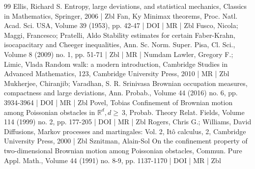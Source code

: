 \documentclass[10pt]{amsart}
\theoremstyle{definition}\newtheorem{defi}[theo]{Definition}\newtheorem{rema}[theo]{Remark}\newtheorem{exam}[theo]{Example}\newtheorem{exem}[theo]{Example}\newtheorem{nota}[theo]{Notation}
\begin{document}
\begin{thebibliography}{99}
Ellis, Richard S. Entropy, large deviations, and statistical mechanics, Classics in Mathematics, Springer, 2006 | Zbl
Fan, Ky Minimax theorems, Proc. Natl. Acad. Sci. USA, Volume 39 (1953), pp. 42-47 | DOI | MR | Zbl
Fusco, Nicola; Maggi, Francesco; Pratelli, Aldo Stability estimates for certain Faber-Krahn, isocapacitary and Cheeger inequalities, Ann. Sc. Norm. Super. Pisa, Cl. Sci., Volume 8 (2009) no. 1, pp. 51-71 | Zbl | MR | Numdam
Lawler, Gregory F.; Limic, Vlada Random walk: a modern introduction, Cambridge Studies in Advanced Mathematics, 123, Cambridge University Press, 2010 | MR | Zbl
Mukherjee, Chiranjib; Varadhan, S. R. Srinivasa Brownian occupation measures, compactness and large deviations, Ann. Probab., Volume 44 (2016) no. 6, pp. 3934-3964 | DOI | MR | Zbl
Povel, Tobias Confinement of Brownian motion among Poissonian obstacles in $\mathbb{R}^d, d\ge ~3$, Probab. Theory Relat. Fields, Volume 114 (1999) no. 2, pp. 177-205 | DOI | MR | Zbl
Rogers, Chris G.; Williams, David Diffusions, Markov processes and martingales: Vol. 2, Itô calculus, 2, Cambridge University Press, 2000 | Zbl
Sznitman, Alain-Sol On the confinement property of two-dimensional Brownian motion among Poissonian obstacles, Commun. Pure Appl. Math., Volume 44 (1991) no. 8-9, pp. 1137-1170 | DOI | MR | Zbl
\end{thebibliography}
\end{document}
